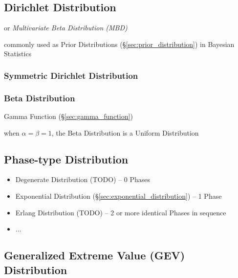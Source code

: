 \subsection{Dirichlet Distribution}\label{sec:dirichlet_distribution}

or \emph{Multivariate Beta Distribution (MBD)}

commonly used as Prior Distributions (\S\ref{sec:prior_distribution}) in
Bayesian Statistics



\subsubsection{Symmetric Dirichlet Distribution}\label{sec:symmetric_dirichlet}

\subsubsection{Beta Distribution}\label{sec:beta_distribution}

Gamma Function (\S\ref{sec:gamma_function})

when $\alpha = \beta = 1$, the Beta Distribution is a Uniform Distribution



\subsection{Phase-type Distribution}\label{sec:phasetype_distribution}

\begin{itemize}
  \item Degenerate Distribution (TODO) -- 0
    Phases
  \item Exponential Distribution (\S\ref{sec:exponential_distribution}) -- 1
    Phase
  \item Erlang Distribution (TODO) -- 2 or more identical Phases in sequence
  \item ...
\end{itemize}



\subsection{Generalized Extreme Value (GEV) Distribution}\label{sec:gev}

